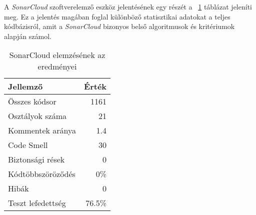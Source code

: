 A \textit{SonarCloud} szoftverelemző eszköz jelentésének egy részét a ~\ref{tab:sonar} táblázat jeleníti meg. Ez a jelentés magában foglal különböző statisztikai adatokat a teljes kódbázisról, amit a \textit{SonarCloud} bizonyos belső algoritmusok és kritériumok alapján számol.

\begin{table}
    \centering
    \begin{tabular}{|l|r|}
    \hline
    Jellemző & Érték \\ \hline
    \hline
    Összes kódsor & 1161 \\ \hline
    Osztályok száma & 21 \\ \hline
    Kommentek aránya & 1.4 \\ \hline
    Code Smell & 30 \\ \hline
    Biztonsági rések & 0 \\ \hline
    Kódtöbbszöröződés & 0\% \\ \hline
    Hibák & 0 \\ \hline
    Teszt lefedettség & 76.5\% \\ \hline
    \end{tabular}
    \caption{SonarCloud elemzésének az eredményei}
    \label{tab:sonar}
\end{table}

